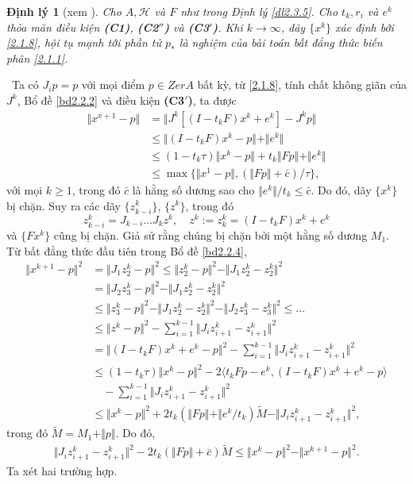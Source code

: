 \documentclass[14pt, oneside,A4paper]{book}
\theoremstyle{plain}
\newcommand{\chm}{{\bf  Chứng minh.}}
\newtheorem{dl}[theorem]{Định lý}
\begin{document}
\begin{dl}[xem \cite{BHN}] \label{dl2.3.7}
Cho $A,\mathcal H$ và $F$ như trong Định lý \ref{dl2.3.5}. Cho $t_{k},r_{i}$ và $e^{k}$ thỏa mãn điều kiện {\rm  \bf (C1)}, {\rm \bf ({C2}$''$)} và {\rm \bf ({C3}$'$)}. Khi $k\rightarrow \infty$, dãy $\lbrace x^{k} \rbrace$ xác định bởi \eqref{2.1.8}, hội tụ mạnh tới phần tử $p_{*}$ là nghiệm của bài toán bất đẳng thức biến phân \eqref{2.1.1}.
\end{dl}
\noindent \chm \rm \ 
Ta có $J_{i}p=p$ với mọi điểm $p \in ZerA$ bất kỳ, từ \eqref{2.1.8}, tính chất không giãn của $J^{k}$, Bổ đề \ref{bd2.2.2} và điều kiện {\bf ({C3}$'$)}, ta được
\begin{align*}
\Vert x^{x+1} - p \Vert &= \Vert J^{k}[(I-t_{k}F)x^{k}+e^{k}]-J^{k}p\Vert \\
&\leq \Vert (I-t_{k}F)x^{k}-p \Vert + \Vert e^{k} \Vert \\
&\leq (1-t_{k}\tau)\Vert x^{k}-p\Vert+t_{k}\Vert Fp \Vert + \Vert e^{k} \Vert \\
&\leq \max \lbrace \Vert x^{1}-p \Vert,(\Vert Fp \Vert + \bar{c})/\tau \rbrace,
\end{align*}
với mọi $k\geq 1$, trong đó $\bar{c}$ là hằng số dương sao cho $\Vert e^{k} \Vert/t_{k} \leq \bar{c}$. Do đó, dãy $\lbrace x^{k} \rbrace$ bị chặn. Suy ra các dãy $\{ z_{k-i}^{k} \}$, $\{z^k\}$, trong đó $$z_{k-i}^{k}=J_{k-i}\dots J_{k}z^{k}, \quad z^{k}:=z_{k}^{k}=(I-t_{k}F)x^{k}+e^{k}$$ và $\lbrace Fx^{k} \rbrace$ cũng bị chặn. Giả sử rằng chúng bị chặn bởi một hằng số dương $M_{1}$. Từ  bất đẳng thức đầu tiên trong Bổ đề \ref{bd2.2.4},
\begin{align*}
\Vert x^{k+1}-p \Vert^{2} &= \Vert J_{1}z_{2}^{k}-p\Vert^{2} \leq \Vert z_{2}^{k}-p \Vert^{2} - \Vert J_{1}z_{2}^{k}-z_{2}^{k}\Vert^{2} \\
&= \Vert J_{2}z_{3}^{k}-p\Vert^{2} - \Vert J_{1}z_{2}^{k}-z_{2}^{k}\Vert^{2} \\
& \leq \Vert z_{3}^{k}-p\Vert^{2} - \Vert J_{1}z_{2}^{k}-z_{2}^{k}\Vert^{2}-\Vert J_{2}z_{3}^{k}-z_{3}^{k}\Vert^{2} \leq ... \\
& \leq \Vert z^{k}-p\Vert^{2} - \sum_{i=1}^{k-1}\Vert J_{i}z_{i+1}^{k}-z_{i+1}^{k}\Vert^{2} \\
& = \Vert (I-t_{k}F)x^{k}+e^{k}-p\Vert^{2} - \sum_{i=1}^{k-1}\Vert J_{i}z_{i+1}^{k}-z_{i+1}^{k}\Vert^{2} \\
& \leq (1-t_{k}\tau)\Vert x^{k}-p\Vert^{2}-2\langle t_{k}Fp-e^{k},(I-t_{k}F)x^{k}+e^{k}-p \rangle \\
&\quad - \sum_{i=1}^{k-1}\Vert J_{i}z_{i+1}^{k}-z_{i+1}^{k} \Vert^{2} \\
& \leq \Vert x^{k}-p \Vert^{2}+2t_{k}(\Vert Fp\Vert+\Vert e^{k}/ t_{k})\tilde{M}-\Vert J_{i}z_{i+1}^{k}-z_{i+1}^{k}\Vert^{2},
\end{align*}
trong đó $\tilde{M}=M_{1}+\Vert p\Vert$. Do đó,
\begin{align*}
\Vert J_{i}z_{i+1}^{k}-z_{i+1}^{k}\Vert^{2}-2t_{k}(\Vert Fp\Vert+\bar{c})\tilde{M} \leq \Vert x^{k}-p \Vert^{2}-\Vert x^{k+1} - p \Vert^{2}.
\end{align*}
Ta xét hai trường hợp.
\end{document}
